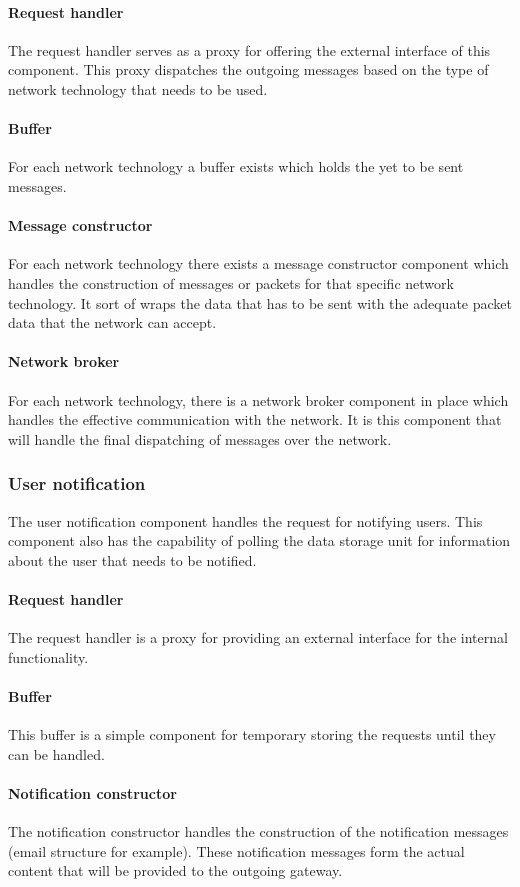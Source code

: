\paragraph{Request handler}
The request handler serves as a proxy for offering the external interface of this component.
This proxy dispatches the outgoing messages based on the type of network technology that needs to be used. 
\paragraph{Buffer} 
For each network technology a buffer exists which holds the yet to be sent messages. 
\paragraph{Message constructor} 
For each network technology there exists a message constructor component which handles the construction of messages or packets for that specific network technology. 
It sort of wraps the data that has to be sent with the adequate packet data that the network can accept.
\paragraph{Network broker} 
For each network technology, there is a network broker component in place which handles the effective communication with the network. 
It is this component that will handle the final dispatching of messages over the network.
\subsubsection{User notification}
The user notification component handles the request for notifying users.
This component also has the capability of polling the data storage unit for information about the 
user that needs to be notified.
\paragraph{Request handler} 
The request handler is a proxy for providing an external interface for the internal functionality.
\paragraph{Buffer} 
This buffer is a simple component for temporary storing the requests until they can be handled.
\paragraph{Notification constructor} 
The notification constructor handles the construction of the notification messages (email structure for example). 
These notification messages form the actual content that will be provided to the outgoing gateway.
